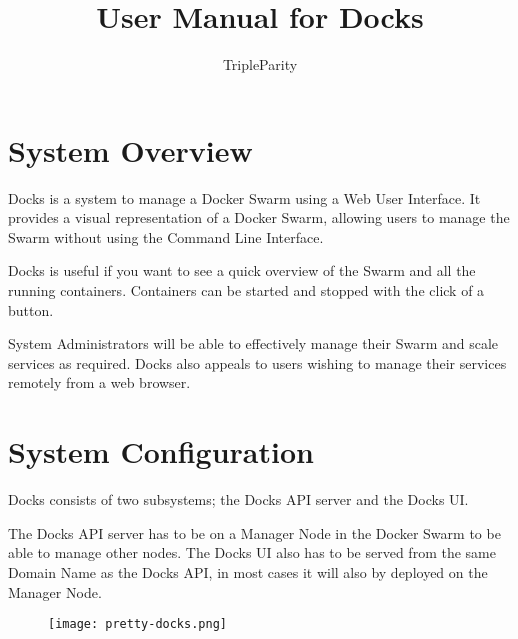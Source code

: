 \documentclass[]{article}
\title{User Manual for Docks}
\author{TripleParity}
\date{}
\begin{document}
	
\maketitle

\tableofcontents

\section{System Overview}
Docks is a system to manage a Docker Swarm using a Web User Interface. It provides a visual representation of a Docker Swarm, allowing users to manage the Swarm without using the Command Line Interface.

Docks is useful if you want to see a quick overview of the Swarm and all the running containers. Containers can be started and stopped with the click of a button.

System Administrators will be able to effectively manage their Swarm and scale services as required. Docks also appeals to users wishing to manage their services remotely from a web browser.

\section{System Configuration}
Docks consists of two subsystems; the Docks API server and the Docks UI.

The Docks API server has to be on a Manager Node in the Docker Swarm to be able to manage other nodes. The Docks UI also has to be served from the same Domain Name as the Docks API, in most cases it will also by deployed on the Manager Node.

\begin{figure}[h!]
	\centering
	\texttt{[image: pretty-docks.png]}
\end{figure}

\pagebreak
\end{document}
